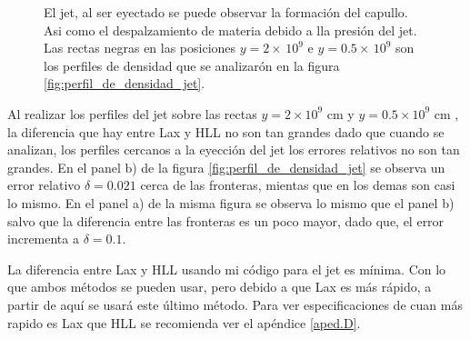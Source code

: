 \documentclass[12pt,a4paper]{book}
\begin{document}
\begin{figure}
\caption{\label{fig:jet_ma_300_analisis} El jet, al ser eyectado se puede observar la formación del capullo. Asi como el despalzamiento de materia debido a lla presión del jet. Las rectas negras en las posiciones $y = 2 \times \, 10^9$ e $y = 0.5 \times \, 10^9$ son los perfiles de densidad que se analizarón en la figura \ref{fig:perfil_de_densidad_jet}.}
\end{figure}

Al realizar los perfiles del jet sobre las rectas $y = 2 \times 10^9$ cm y $y = 0.5 \times 10^9$ cm , la diferencia que hay entre Lax y HLL no son tan grandes dado que cuando se analizan, los perfiles cercanos a la eyección del jet los errores relativos no son tan grandes. En el panel b) de la  figura \ref{fig:perfil_de_densidad_jet} se observa un error relativo $\delta = 0.021$ cerca de las fronteras, mientas que en los demas son casi lo mismo. En el panel a) de la misma figura se observa lo mismo que el panel b) salvo que la diferencia entre las fronteras es un poco mayor, dado que, el error incrementa a $\delta  = 0.1$.

La diferencia entre Lax y HLL usando mi código para el jet es mínima. Con lo que ambos métodos se pueden usar, pero debido a que Lax es más rápido, a partir de aquí se usará este último método. Para ver especificaciones de cuan más rapido es Lax que HLL se recomienda ver el apéndice \ref{aped.D}.
\end{document}
